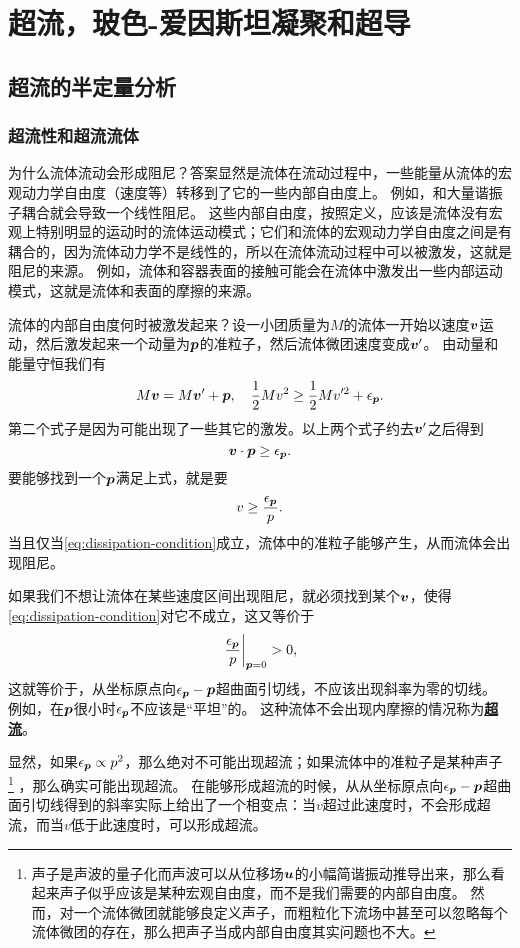 \documentclass[hyperref, UTF8, a4paper]{ctexart}
\newcommand{\concept}[1]{\underline{\textbf{#1}}}
\begin{document}
\section{超流，玻色-爱因斯坦凝聚和超导}

\subsection{超流的半定量分析}

\subsubsection{超流性和超流流体}\label{sec:intro-superfluid}

为什么流体流动会形成阻尼？答案显然是流体在流动过程中，一些能量从流体的宏观动力学自由度（速度等）转移到了它的一些内部自由度上。
例如，和大量谐振子耦合就会导致一个线性阻尼。
这些内部自由度，按照定义，应该是流体没有宏观上特别明显的运动时的流体运动模式；它们和流体的宏观动力学自由度之间是有耦合的，因为流体动力学不是线性的，所以在流体流动过程中可以被激发，这就是阻尼的来源。
例如，流体和容器表面的接触可能会在流体中激发出一些内部运动模式，这就是流体和表面的摩擦的来源。

流体的内部自由度何时被激发起来？设一小团质量为$M$的流体一开始以速度$\vb*{v}$运动，然后激发起来一个动量为$\vb*{p}$的准粒子，然后流体微团速度变成$\vb*{v}'$。
由动量和能量守恒我们有
\[
    M \vb*{v} = M \vb*{v}' + \vb*{p}, \quad \frac{1}{2} M v^2 \geq \frac{1}{2} M v'^2 + \epsilon_{\vb*{p}}.
\]
第二个式子是因为可能出现了一些其它的激发。以上两个式子约去$\vb*{v}'$之后得到
\[
    \vb*{v} \cdot \vb*{p} \geq \epsilon_{\vb*{p}}.
\]
要能够找到一个$\vb*{p}$满足上式，就是要
\begin{equation}
    v \geq \frac{\epsilon_{\vb*{p}}}{p}.
    \label{eq:dissipation-condition}
\end{equation}
当且仅当\eqref{eq:dissipation-condition}成立，流体中的准粒子能够产生，从而流体会出现阻尼。

如果我们不想让流体在某些速度区间出现阻尼，就必须找到某个$\vb*{v}$，使得\eqref{eq:dissipation-condition}对它不成立，这又等价于
\[
    \eval{\frac{\epsilon_{\vb*{p}}}{p}}_{\vb*{p}=0} > 0,
\]
这就等价于，从坐标原点向$\epsilon_{\vb*{p}}-\vb*{p}$超曲面引切线，不应该出现斜率为零的切线。
例如，在$\vb*{p}$很小时$\epsilon_{\vb*{p}}$不应该是“平坦”的。
这种流体不会出现内摩擦的情况称为\concept{超流}。

显然，如果$\epsilon_{\vb*{p}} \propto p^2$，那么绝对不可能出现超流；如果流体中的准粒子是某种声子%
\footnote{声子是声波的量子化而声波可以从位移场$\vb*{u}$的小幅简谐振动推导出来，那么看起来声子似乎应该是某种宏观自由度，而不是我们需要的内部自由度。
然而，对一个流体微团就能够良定义声子，而粗粒化下流场中甚至可以忽略每个流体微团的存在，那么把声子当成内部自由度其实问题也不大。}%
，那么确实可能出现超流。
在能够形成超流的时候，从从坐标原点向$\epsilon_{\vb*{p}}-\vb*{p}$超曲面引切线得到的斜率实际上给出了一个相变点：当$v$超过此速度时，不会形成超流，而当$v$低于此速度时，可以形成超流。
\end{document}
